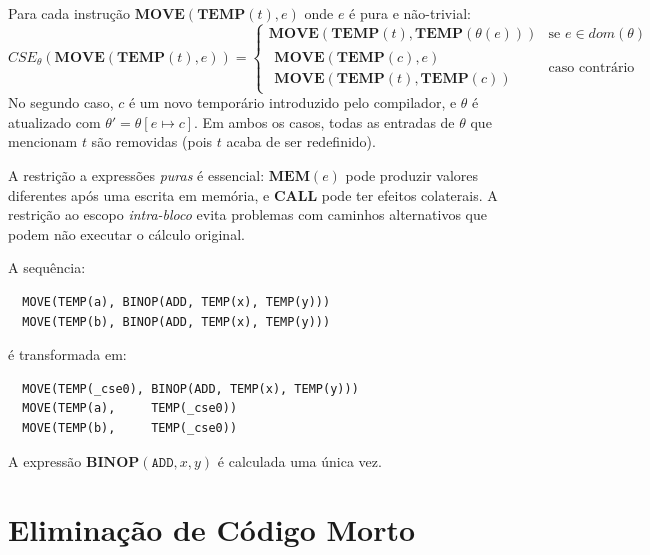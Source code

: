 \begin{Definition}\label{def:cse-transform}
  Para cada instrução $\mathbf{MOVE}(\mathbf{TEMP}(t), e)$ onde $e$ é pura e
  não-trivial:
  \[
    \mathit{CSE}_\theta(\mathbf{MOVE}(\mathbf{TEMP}(t), e)) =
    \begin{cases}
      \mathbf{MOVE}(\mathbf{TEMP}(t), \mathbf{TEMP}(\theta(e)))
      & \text{se } e \in \mathit{dom}(\theta) \\[4pt]
      \begin{array}{l}
        \mathbf{MOVE}(\mathbf{TEMP}(c), e) \\
        \mathbf{MOVE}(\mathbf{TEMP}(t), \mathbf{TEMP}(c))
      \end{array}
      & \text{caso contrário}
    \end{cases}
  \]
  No segundo caso, $c$ é um novo temporário introduzido pelo compilador, e
  $\theta$ é atualizado com $\theta' = \theta[e \mapsto c]$.
  Em ambos os casos, todas as entradas de $\theta$ que mencionam $t$ são
  removidas (pois $t$ acaba de ser redefinido).
\end{Definition}

\begin{remark}
  A restrição a expressões \emph{puras} é essencial: $\mathbf{MEM}(e)$ pode
  produzir valores diferentes após uma escrita em memória, e $\mathbf{CALL}$
  pode ter efeitos colaterais.  A restrição ao escopo \emph{intra-bloco}
  evita problemas com caminhos alternativos que podem não executar o cálculo
  original.
\end{remark}

\begin{example}
  A sequência:
  \begin{verbatim}
  MOVE(TEMP(a), BINOP(ADD, TEMP(x), TEMP(y)))
  MOVE(TEMP(b), BINOP(ADD, TEMP(x), TEMP(y)))
  \end{verbatim}
  é transformada em:
  \begin{verbatim}
  MOVE(TEMP(_cse0), BINOP(ADD, TEMP(x), TEMP(y)))
  MOVE(TEMP(a),     TEMP(_cse0))
  MOVE(TEMP(b),     TEMP(_cse0))
  \end{verbatim}
  A expressão $\mathbf{BINOP}(\mathtt{ADD}, x, y)$ é calculada uma única vez.
\end{example}

\section{Eliminação de Código Morto}\label{sec:opt-dce}

